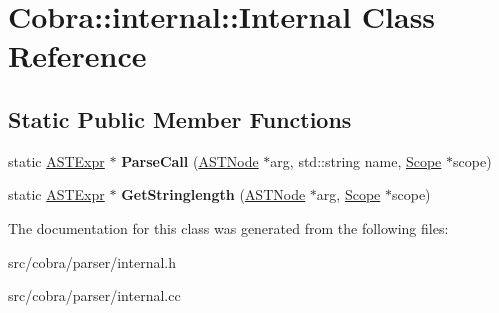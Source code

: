 \hypertarget{class_cobra_1_1internal_1_1_internal}{\section{Cobra\+:\+:internal\+:\+:Internal Class Reference}
\label{class_cobra_1_1internal_1_1_internal}
}
\subsection*{Static Public Member Functions}
\begin{DoxyCompactItemize}
\item 
\hypertarget{class_cobra_1_1internal_1_1_internal_ad15d96c5a187ae286de4640085c17c43}{static \hyperlink{class_cobra_1_1internal_1_1_a_s_t_expr}{A\+S\+T\+Expr} $\ast$ {\bfseries Parse\+Call} (\hyperlink{class_cobra_1_1internal_1_1_a_s_t_node}{A\+S\+T\+Node} $\ast$arg, std\+::string name, \hyperlink{class_cobra_1_1internal_1_1_scope}{Scope} $\ast$scope)}\label{class_cobra_1_1internal_1_1_internal_ad15d96c5a187ae286de4640085c17c43}

\item 
\hypertarget{class_cobra_1_1internal_1_1_internal_abb2e1f2cd82503a7f90d4db1635dffd5}{static \hyperlink{class_cobra_1_1internal_1_1_a_s_t_expr}{A\+S\+T\+Expr} $\ast$ {\bfseries Get\+Stringlength} (\hyperlink{class_cobra_1_1internal_1_1_a_s_t_node}{A\+S\+T\+Node} $\ast$arg, \hyperlink{class_cobra_1_1internal_1_1_scope}{Scope} $\ast$scope)}\label{class_cobra_1_1internal_1_1_internal_abb2e1f2cd82503a7f90d4db1635dffd5}

\end{DoxyCompactItemize}


The documentation for this class was generated from the following files\+:\begin{DoxyCompactItemize}
\item 
src/cobra/parser/internal.\+h\item 
src/cobra/parser/internal.\+cc\end{DoxyCompactItemize}
